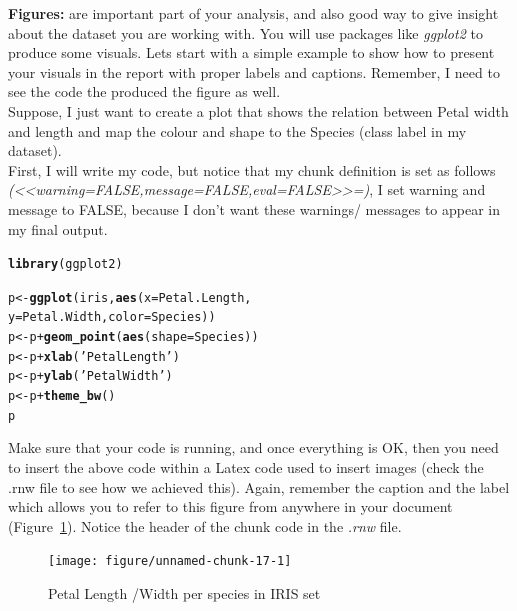 \documentclass[10pt  ,usenames, dvipsnames]{article}\usepackage[]{graphicx}\usepackage[]{color}
\makeatletter
\newcommand{\hlstr}[1]{\textcolor[rgb]{0.192,0.494,0.8}{#1}}%
\newcommand{\hlopt}[1]{\textcolor[rgb]{0,0,0}{#1}}%
\newcommand{\hlstd}[1]{\textcolor[rgb]{0.345,0.345,0.345}{#1}}%
\newcommand{\hlkwb}[1]{\textcolor[rgb]{0.69,0.353,0.396}{#1}}%
\newcommand{\hlkwc}[1]{\textcolor[rgb]{0.333,0.667,0.333}{#1}}%
\newcommand{\hlkwd}[1]{\textcolor[rgb]{0.737,0.353,0.396}{\textbf{#1}}}%
\newenvironment{kframe}{%
 \def\at@end@of@kframe{}%
 \ifinner\ifhmode%
  \def\at@end@of@kframe{\end{minipage}}%
  \begin{minipage}{\columnwidth}%
 \fi\fi%
 \def\FrameCommand##1{\hskip\@totalleftmargin \hskip-\fboxsep
 \colorbox{shadecolor}{##1}\hskip-\fboxsep
     \hskip-\linewidth \hskip-\@totalleftmargin \hskip\columnwidth}%
 \MakeFramed {\advance\hsize-\width
   \@totalleftmargin\z@ \linewidth\hsize
   \@setminipage}}%
 {\par\unskip\endMakeFramed%
 \at@end@of@kframe}
\newenvironment{knitrout}{}{} %
\makeatother
\begin{document}
\textbf{Figures:} are important part of your analysis, and also good way to give insight about the dataset you are working with. You will use packages like \textit{ggplot2} to produce some visuals. Lets start with a simple example to show how to present your visuals in the report with proper labels and captions. Remember, I need to see the code the produced the figure as well. \\

Suppose, I just want to create a plot that shows the relation between Petal width and length and map the colour and shape to the Species (class label in my dataset). \\

First, I will write my code, but notice that my chunk definition is set as follows\\ \textit{(<<warning=FALSE,message=FALSE,eval=FALSE>>=)}, I set warning and message to FALSE, because I don't want these warnings/ messages to appear in my final output. 


\begin{knitrout}
\color{fgcolor}\begin{kframe}
\begin{alltt}
\hlkwd{library}\hlstd{(ggplot2)}

\hlstd{p} \hlkwb{<-} \hlkwd{ggplot}\hlstd{(iris,} \hlkwd{aes}\hlstd{(}\hlkwc{x}\hlstd{=Petal.Length,}
                      \hlkwc{y} \hlstd{= Petal.Width,}\hlkwc{color}\hlstd{=Species) )}
\hlstd{p} \hlkwb{<-} \hlstd{p}\hlopt{+} \hlkwd{geom_point}\hlstd{(}\hlkwd{aes}\hlstd{(}\hlkwc{shape}\hlstd{=Species))}
\hlstd{p} \hlkwb{<-} \hlstd{p} \hlopt{+} \hlkwd{xlab}\hlstd{(}\hlstr{'Petal Length'}\hlstd{)}
\hlstd{p} \hlkwb{<-} \hlstd{p} \hlopt{+} \hlkwd{ylab}\hlstd{(}\hlstr{'Petal Width'}\hlstd{)}
\hlstd{p} \hlkwb{<-} \hlstd{p} \hlopt{+} \hlkwd{theme_bw}\hlstd{()}
\hlstd{p}
\end{alltt}
\end{kframe}
\end{knitrout}

Make sure that your code is running, and once everything is OK, then you need to insert the above code within a Latex code used to insert images (check the .rnw file to see how we achieved this). Again, remember the caption and the label which allows you to refer to this figure from anywhere in your document (Figure~\ref{fig1}). Notice the header of the chunk code in the \textit{.rnw} file. 

\begin{figure}[H]
\begin{center}

\begin{knitrout}
\color{fgcolor}
\texttt{[image: figure/unnamed-chunk-17-1]} 

\end{knitrout}
\caption {Petal Length /Width per species in IRIS set}
\label{fig1}
\end {center}
\end {figure}
\end{document}
